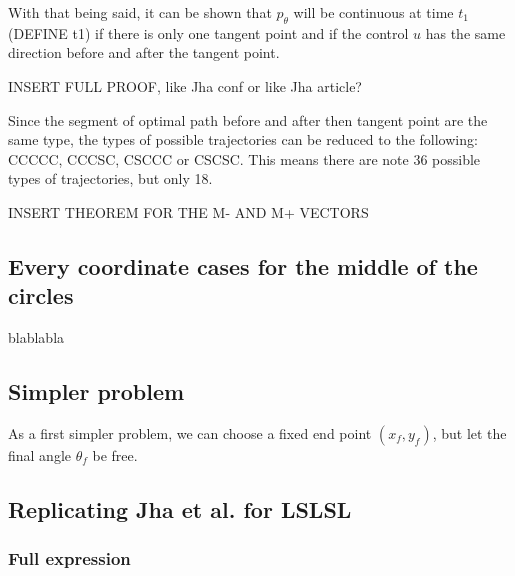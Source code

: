 \documentclass[12pt]{article}
\begin{document}
With that being said, it can be shown that $p_\theta$ will be continuous at time $t_1$ (DEFINE t1) if there is only one tangent point and if the control $u$ has the same direction before and after the tangent point.

INSERT FULL PROOF, like Jha conf or like Jha article?

Since the segment of optimal path before and after then tangent point are the same type, the types of possible trajectories can be reduced to the following: CCCCC, CCCSC, CSCCC or CSCSC. This means there are note 36 possible types of trajectories, but only 18.

INSERT THEOREM FOR THE M- AND M+ VECTORS


\subsection{Every coordinate cases for the middle of the circles}

blablabla

\subsection{Simpler problem}

As a first simpler problem, we can choose a fixed end point $(x_f,y_f)$, but let the final angle $\theta_f$ be free.


\subsection{Replicating Jha et al. for LSLSL}

\subsubsection*{Full expression}
\end{document}
